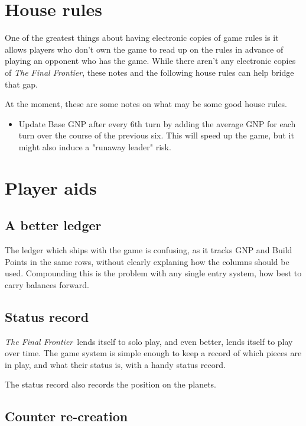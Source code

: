 \documentclass[10pt]{article}
\def\tff{{\em The Final Frontier}}
\begin{document}
\section{House rules}

One of the greatest things about having electronic copies of game rules
is it allows players who don't own the game to read up on the rules in
advance of playing an opponent who has the game. While there aren't any
electronic copies of \tff, these notes and the following house rules can
help bridge that gap.

At the moment, these are some notes on what may be some good house rules.

\begin{itemize}
  \item Update Base GNP after every 6th turn by adding the average GNP
    for each turn over the course of the previous six. This will speed up
    the game, but it might also induce a "runaway leader" risk.
\end{itemize}

\section{Player aids}

\subsection{A better ledger}

The ledger which ships with the game is confusing, as it tracks GNP and
Build Points in the same rows, without clearly explaning how the columns
should be used. Compounding this is the problem with any single entry system,
how best to carry balances forward.

\subsection{Status record}

\tff\ lends itself to solo play, and even better, lends itself
to play over time. The game system is simple enough to keep a record of
which pieces are in play, and what their status is, with a handy status
record.

The status record also records the position on the planets.

\subsection{Counter re-creation}
\end{document}
